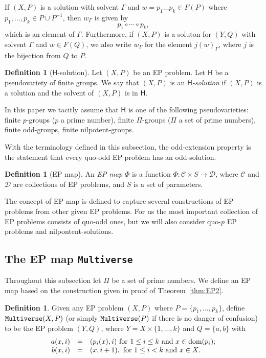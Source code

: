 \documentclass[10pt,a4paper]{amsart}
\theoremstyle{definition}
\newtheorem{definition}[theorem]{Definition}
\newcommand{\dom}{{\mbox{\rm dom}}}
\theoremstyle{definition}
\numberwithin{equation}{section}
\begin{document}
If $(X, P)$ is a solution with solvent $\Gamma$ and $w=p_1\dots p_k\in F(P)$ where $p_1, \dots, p_k\in P\cup P^{-1}$, then $w_\Gamma$ is given by 
$$ p_1\circ \cdots \circ p_k,$$
which is an element of $\Gamma$. Furthermore, if $(X, P)$ is a soluton for $(Y, Q)$ with solvent $\Gamma$ and $w\in F(Q)$, we also write $w_\Gamma$ for the element $j(w)_\Gamma$, where $j$ is the bijection from $Q$ to $P$.

\begin{definition}[$\mathsf{H}$-solution] Let $(X, P)$ be an EP problem. Let $\mathsf{H}$ be a pseudovariety of  finite groups.
We say that $(X, P)$ is an {\em $\mathsf{H}$-solution} if $(X, P)$ is a solution and the solvent of $(X, P)$ is in $\mathsf{H}$.
\end{definition}

In this paper we tacitly assume that $\mathsf{H}$ is one of the following pseudovarieties: 
finite $p$-groups ($p$ a prime number), finite $\Pi$-groups ($\Pi$ a set of prime numbers), finite odd-groups, finite nilpotent-groups.


With the terminology defined in this subsection, the odd-extension property is the statement that every quo-odd EP problem has an odd-solution.

\begin{definition}[EP map]\label{def:EPmap} An {\em EP map} $\Phi$ is a function $\Phi\colon \mathcal{C}\times S\to \mathcal{D}$, where $\mathcal{C}$ and $\mathcal{D}$ are collections of EP problems, and $S$ is a set of parameters.
\end{definition}

The concept of EP map is defined to capture several constructions of EP problems from other given EP problems. For us the most important collection of EP problems consists of quo-odd ones, but we will also consider quo-$p$ EP problems and nilpontent-solutions.




\subsection{The EP map {\tt Multiverse}}

Throughout this subsection let $\Pi$ be a set of prime numbers. We define an EP map based on the construction given in proof of Theorem~\ref{thm:EP2}. 


\begin{definition}\label{def:multiverse} Given any EP problem $(X, P)$ where $P=\{p_1,\dots, p_k\}$, define ${\tt Multiverse}(X, P)$ (or simply $\mbox{\tt Multiverse}(P)$ if there is no danger of confusion) to be the EP problem $(Y, Q)$, where $Y=X\times\{1,\dots, k\}$ and $Q=\{a, b\}$
with
$$ \begin{array}{rcl} a(x,i)&=& (p_i(x),i) \mbox{ for $1\leq i\leq k$ and $x\in\dom(p_i)$;} \\ 
b(x,i)&=& (x, i+1), \mbox{ for $1\leq i<k$ and $x\in X$.}
\end{array}
$$
\end{definition}
\end{document}
